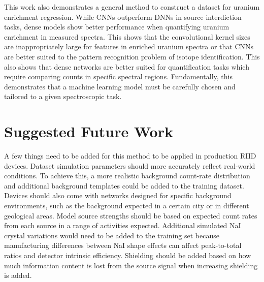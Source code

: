 This work also demonstrates a general method to construct a dataset for uranium enrichment regression. While CNNs outperform DNNs in source interdiction tasks, dense models show better performance when quantifying uranium enrichment in measured spectra. This shows that the convolutional kernel sizes are inappropriately large for features in enriched uranium spectra or that CNNs are better suited to the pattern recognition problem of isotope identification. This also shows that dense networks are better suited for quantification tasks which require comparing counts in specific spectral regions. Fundamentally, this demonstrates that a machine learning model must be carefully chosen and tailored to a given spectroscopic task.





\section{Suggested Future Work}

A few things need to be added for this method to be applied in production RIID devices. Dataset simulation parameters should more accurately reflect real-world conditions. To achieve this, a more realistic background count-rate distribution and additional background templates could be added to the training dataset. Devices should also come with networks designed for specific background environments, such as the background expected in a certain city or in different geological areas. Model source strengths should be based on expected count rates from each source in a range of activities expected. Additional simulated NaI crystal variations would need to be added to the training set because manufacturing differences between NaI shape effects can affect peak-to-total ratios and detector intrinsic efficiency. Shielding should be added based on how much information content is lost from the source signal when increasing shielding is added.





